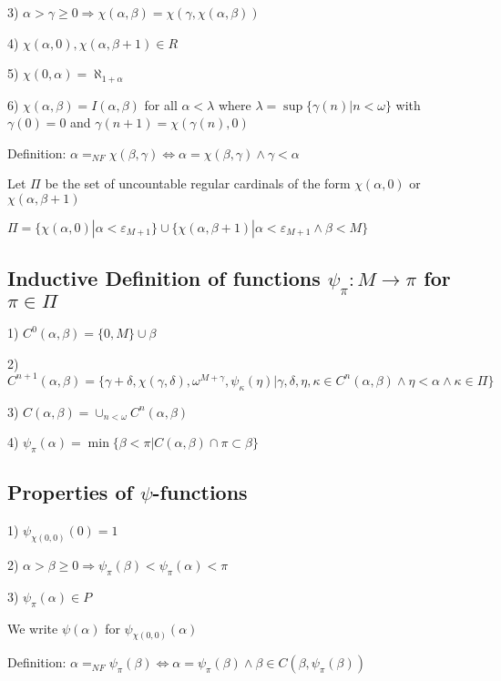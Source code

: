 \documentclass[10pt]{article}
\begin{document}
3) \(\alpha>\gamma\geq 0 \Rightarrow \chi(\alpha,\beta)=\chi(\gamma,\chi(\alpha,\beta))\)

4) \(\chi(\alpha,0),\chi(\alpha,\beta+1) \in R\)

5) \(\chi(0,\alpha)=\aleph_{1+\alpha}\)

6) \(\chi(\alpha,\beta)=I(\alpha,\beta)\) for all \(\alpha<\lambda\) where \(\lambda=\sup\{\gamma(n)|n<\omega\}\) with \(\gamma(0)=0\) and \(\gamma(n+1)=\chi(\gamma(n),0)\)

\bigskip

Definition: \(\alpha=_{NF}\chi(\beta,\gamma) \Leftrightarrow\alpha=\chi(\beta,\gamma)\wedge\gamma<\alpha\)

\bigskip

Let \(\Pi\)  be the set of uncountable regular cardinals of the form \(\chi(\alpha,0)\) or \(\chi(\alpha,\beta+1)\) 

\(\Pi=\{\chi(\alpha,0)|\alpha<\varepsilon_{M+1}\}\cup\{\chi(\alpha,\beta+1)|\alpha<\varepsilon_{M+1}\wedge\beta<M\}\)

\subsection{Inductive Definition of  functions \(\psi_\pi: M\rightarrow \pi\) for \(\pi\in \Pi\)}

1) \(C^0(\alpha, \beta)=\{0,M\}\cup\beta\)

2) \(C^{n+1}(\alpha, \beta)=\{\gamma+\delta,\chi(\gamma,\delta), \omega^{M+\gamma}, \psi_\kappa(\eta)|\gamma,\delta,\eta,\kappa\in C^{n}(\alpha, \beta)\wedge\eta<\alpha\wedge\kappa\in\Pi\}\)

3) \(C(\alpha,\beta)=\cup_{n<\omega}C^{n}(\alpha, \beta)\)

4) \(\psi_\pi(\alpha)=\min\{\beta<\pi|C(\alpha,\beta)\cap \pi\subset\beta\}\)

\subsection{Properties of  \(\psi\)-functions}

1) \(\psi_{\chi(0,0)}(0)=1\) 

2) \(\alpha>\beta\geq 0 \Rightarrow \psi_\pi(\beta)<\psi_ \pi(\alpha)<\pi\)

3) \(\psi_\pi(\alpha)\in P\)

We write \(\psi(\alpha)\)  for \(\psi_{\chi(0,0)}(\alpha)\)

\bigskip

Definition: \(\alpha=_{NF}\psi_\pi(\beta)\Leftrightarrow\alpha=\psi_\pi(\beta) \wedge\beta\in C(\beta, \psi_\pi(\beta))\)
\end{document}

